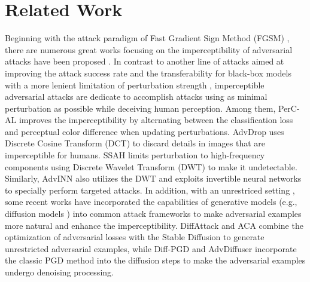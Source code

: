 \documentclass{article}
\begin{document}
\setcounter{theorem}{0} 
\setcounter{lemma}{0}   
\setcounter{proposition}{0}

 


\tableofcontents

\newpage


\section{Related Work} \label{app:A}

 Beginning with the attack paradigm of Fast Gradient Sign Method (FGSM) \cite{goodfellow2014explaining}, 
there are numerous great works focusing on the imperceptibility of adversarial attacks have been proposed \cite{carlini2017towards,luo2018towards,zhao2020towards,laidlaw2021perceptual,duan2021advdrop,chen2023imperceptible,jia2022exploring}.   
In contrast to another line of attacks aimed at improving the attack success rate and the transferability for black-box models with a more lenient limitation of perturbation strength \cite{dong2018boosting,zhang2022enhancing,wei2023enhancing}, imperceptible adversarial attacks are dedicate to accomplish attacks using as minimal perturbation as possible while deceiving human perception. 
Among them, PerC-AL \cite{zhao2020towards} improves the imperceptibility by alternating between the classification loss and perceptual color difference when updating perturbations.
AdvDrop \cite{duan2021advdrop} uses Discrete Cosine Transform (DCT) to discard details in images that are imperceptible for humans. SSAH \cite{luo2022frequency} limits perturbation to high-frequency components using Discrete Wavelet Transform (DWT) to make it undetectable. Similarly, AdvINN \cite{chen2023imperceptible} also utilizes the DWT and exploits invertible neural networks to specially perform targeted attacks. In addition, with an unrestriced setting \cite{song2018constructing}, some recent works have incorporated the capabilities of generative models (e.g., diffusion models \cite{ho2020denoising}) into common attack frameworks to make adversarial examples more natural and enhance the imperceptibility. DiffAttack \cite{chen2023diffusion} and ACA \cite{chen2024content} combine the optimization of adversarial losses with the Stable Diffusion \cite{rombach2022high} to generate unrestricted adversarial examples, while Diff-PGD \cite{xue2023diffusion} and AdvDiffuser \cite{chen2023advdiffuser} incorporate the classic PGD method \cite{madry2018towards} into the diffusion steps to make the adversarial examples undergo denoising processing. 
\end{document}
